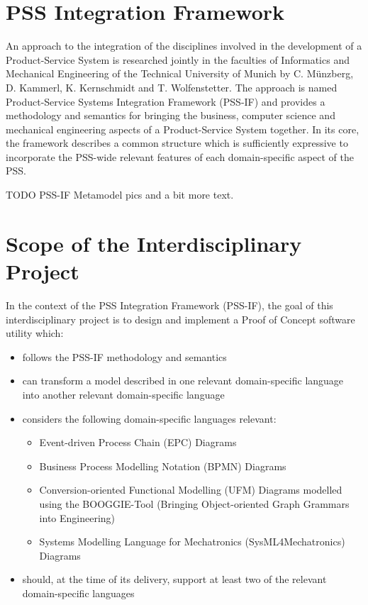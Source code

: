 \section*{PSS Integration Framework}

An approach to the integration of the disciplines involved in the development of a Product-Service System is researched jointly in the faculties of Informatics and Mechanical Engineering of the Technical University of Munich by C. M\"unzberg, D. Kammerl, K. Kernschmidt and T. Wolfenstetter. The approach is named Product-Service Systems Integration Framework (PSS-IF) and provides a methodology and semantics for bringing the business, computer science and mechanical engineering aspects of a Product-Service System together. In its core, the framework describes a common structure which is sufficiently expressive to incorporate the PSS-wide relevant features of each domain-specific aspect of the PSS.

\color{red}TODO PSS-IF Metamodel pics and a bit more text.\color{black}

\section*{Scope of the Interdisciplinary Project}

In the context of the PSS Integration Framework (PSS-IF), the goal of this interdisciplinary project is to design and implement a Proof of Concept software utility which:

\begin{itemize}
\item follows the PSS-IF methodology and semantics
\item can transform a model described in one relevant domain-specific language into another relevant domain-specific language
\item considers the following domain-specific languages relevant:
	\begin{itemize}
	\item Event-driven Process Chain (EPC) Diagrams
	\item Business Process Modelling Notation (BPMN) Diagrams
	\item Conversion-oriented Functional Modelling (UFM) Diagrams modelled using the BOOGGIE-Tool (Bringing Object-oriented Graph Grammars into Engineering)
	\item Systems Modelling Language for Mechatronics (SysML4Mechatronics) Diagrams
	\end{itemize}
\item should, at the time of its delivery, support at least two of the relevant domain-specific languages
\end{itemize} 

